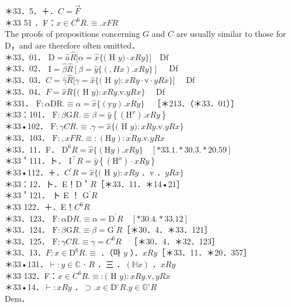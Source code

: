 \documentclass[10pt]{article}
\begin{document}
＊33．5．＋．$C=\vec{F}$\\
＊33 51 ．F：$x \in C^{6} R . \equiv . x F R$\\
The proofs of propositions concerning $G$ and $C$ are usually similar to those for D，and are therefore often omitted．\\
＊33．01． $\mathrm{D}=\hat{a} \hat{R}[\alpha=\hat{x}\{($ H $y) \cdot x R y\}] \quad \mathrm{Df}$\\
＊33．02． $\mathrm{I}=\hat{\beta} \hat{R}[\beta=\hat{y}\{(, H x) . x R y\}] \quad$ Df\\
＊33．03．$C=\hat{\gamma} \hat{R}[\gamma=\hat{x}\{($ H $y): x R y \cdot \mathrm{v} \cdot y R x\}] \quad$ Df\\
＊33．04．$F=\hat{x} \hat{R}\{($ H $y): x R y . \mathrm{v} . y R x\} \quad$ Df\\
＊331． $\mathrm{F}: \alpha \mathrm{DR} . \equiv \alpha=\widehat{x}\{(\mathrm{y} y) . x R y\} \quad$［＊213．（＊33．01）］\\
＊33：101． $\mathrm{F}: \beta \mathrm{G} R . \equiv \beta=\widehat{y}\left\{\left(\mathrm{H}^{x}\right) . x R y\right\}$\\
＊33•102． $\mathrm{F}: \gamma C R . \equiv . \gamma=\widehat{x}\{($ H $y): x R y . \mathrm{v} . y R x\}$\\
＊33．103． $\mathrm{F}:, x F R . \equiv:(\mathrm{H} y): x R y . \mathrm{v} . y R x$\\
＊33．11．F． $\mathrm{D}^{6} R=\widehat{x}\{(\mathrm{H} y) . x R y\} \quad[* 33.1 . * 30.3 . * 20.59]$\\
＊33＇111．ト． $\mathrm{I}^{\top} R=\hat{y}\left\{\left(\mathrm{H}^{x}\right) \cdot x R y\right\}$\\
＊33•112．＋．$C^{\prime} R=\widehat{x}\{($ H $y): x R y$ ．v ．$y R x\}$\\
＊33：12．ト．E！D＇$R$［＊33．11．＊14•21］\\
＊33＇121． ト E ！ $\mathrm{G}^{\prime} R$\\
＊33 122．＋．E！$C^{6} R$\\
＊33．123． $\mathrm{F}: \alpha \mathrm{D} R . \equiv \alpha=\mathrm{D}^{\prime} R \quad[* 30.4 . * 33.12]$\\
＊33．124． $\mathrm{F}: \beta \mathrm{G} R . \equiv \beta=\mathrm{G}^{\prime} R$［＊30．4．＊33．121］\\
＊33．125． $\mathrm{F}: \gamma C R . \equiv \gamma=C^{6} R \quad$［＊30．4．＊32．123］\\
＊33．13．$F: x \in \mathrm{D}^{6} R . \equiv$ ．（마 $y$ ）．$x R y$［＊33．11．＊20．357］\\
＊33•131．$\vdash: y \in \mathbb{C}$ ⋅ $R$ ．三 ．$(\mathbb{H} x)$ ．$x R y$\\
＊33 132．F：$x \in C^{6} R . \equiv:($ H $y): x R y . \mathrm{v}, y R x$\\
＊33•14．$\vdash: x R y$ ．$\supset . x \in \mathrm{D}^{\circ} R . y \in \mathbb{G}^{\circ} R$\\
Dem．
\end{document}
